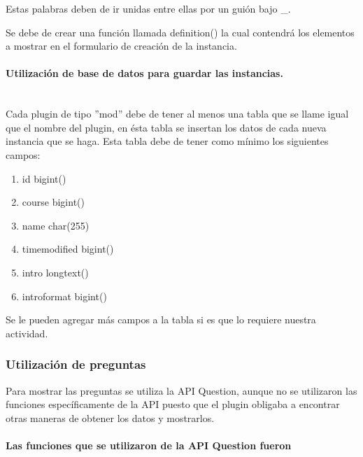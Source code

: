 			Estas palabras deben de ir unidas entre ellas por un guión bajo \_.

		Se debe de crear una función llamada definition() la cual contendrá los elementos a mostrar en el formulario de creación de la instancia.

    \paragraph{Utilización de base de datos para guardar las instancias.}\mbox{}\\

			Cada plugin de tipo ''mod'' debe de tener al menos una tabla que se llame igual que el nombre del plugin, en ésta tabla se insertan los datos de cada nueva instancia que se haga. Esta tabla debe de tener como mínimo los siguientes campos:
      \begin{enumerate}
        \item id bigint()
        \item course bigint()
        \item name char(255)
        \item timemodified bigint()
        \item intro longtext()
        \item introformat bigint()
      \end{enumerate}

        Se le pueden agregar más campos a la tabla si es que lo requiere nuestra actividad.

    \subsubsection{Utilización de preguntas}

		Para mostrar las preguntas se utiliza la API Question, aunque no se utilizaron las funciones específicamente de la API puesto que el plugin obligaba a encontrar otras maneras de obtener los datos y mostrarlos.

    \paragraph{Las funciones que se utilizaron de la API Question fueron}\mbox{}\\

